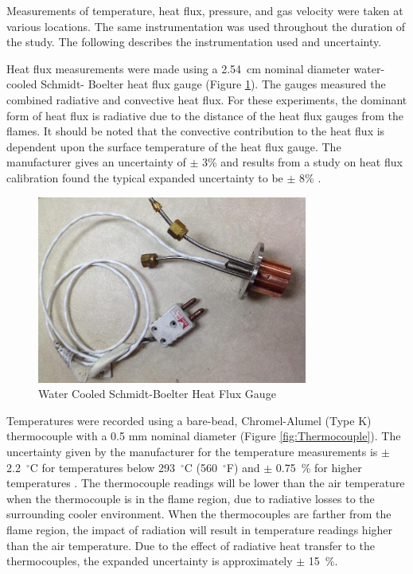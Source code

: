 \documentclass[12pt,oneside]{book}
\begin{document}
Measurements of temperature, heat flux, pressure, and gas velocity were taken at various locations. The same instrumentation was used throughout the duration of the study. The following describes the instrumentation used and uncertainty.

Heat flux measurements were made using a 2.54~cm nominal diameter water-cooled Schmidt- Boelter heat flux gauge (Figure \ref{fig:HeatFluxGauge}). The gauges measured the combined radiative and convective heat flux. For these experiments, the dominant form of heat flux is radiative due to the distance of the heat flux gauges from the flames. It should be noted that the convective contribution to the heat flux is dependent upon the surface temperature of the heat flux gauge. The manufacturer gives an uncertainty of $\pm$ 3\% and results from a study on heat flux calibration found the typical expanded uncertainty to be $\pm$ 8\% \cite{HeatFluxRoundRobin}. 

\begin{figure} [H]
	\centering
	\includegraphics[width = 3.5in]{0_Images/Instrumentation/Heat_Flux_Gauge.jpg}
	\caption{Water Cooled Schmidt-Boelter Heat Flux Gauge}
	\label{fig:HeatFluxGauge}
\end{figure}

Temperatures were recorded using a bare-bead, Chromel-Alumel (Type K) thermocouple with a 0.5 mm nominal diameter (Figure \ref{fig:Thermocouple}). The uncertainty given by the manufacturer for the temperature measurements is $\pm$ 2.2~$^\circ$C for temperatures below 293~$^\circ$C (560~$^\circ$F) and $\pm$ 0.75~\% for higher temperatures \cite{TemperatureHandbook}. The thermocouple readings will be lower than the air temperature when the thermocouple is in the flame region, due to radiative losses to the surrounding cooler environment. When the thermocouples are farther from the flame region, the impact of radiation will result in temperature readings higher than the air temperature. Due to the effect of radiative heat transfer to the thermocouples, the expanded uncertainty is approximately $\pm$ 15~\%.
\end{document}
